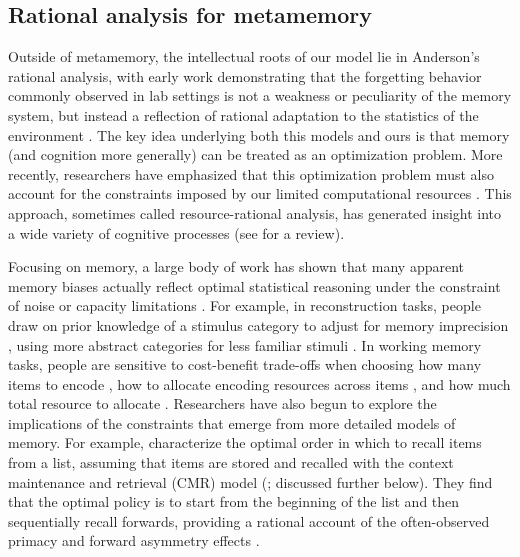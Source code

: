 


\subsection{Rational analysis for metamemory}

Outside of metamemory, the intellectual roots of our model lie in Anderson's \citeyearpar{anderson1990adaptive} rational analysis, with early work demonstrating that the forgetting behavior commonly observed in lab settings is not a weakness or peculiarity of the memory system, but instead a reflection of rational adaptation to the statistics of the environment \citep{anderson1989human}. The key idea underlying both this models and ours is that memory (and cognition more generally) can be treated as an optimization problem. More recently, researchers have emphasized that this optimization problem must also account for the constraints imposed by our limited computational resources \citep{griffiths2015rational,howes2009rational,lewis2014computational,gershman2015computational}. This approach, sometimes called resource-rational analysis, has generated insight into a wide variety of cognitive processes (see \citealp{lieder2020resourcerational} for a review).

Focusing on memory, a large body of work has shown that many apparent memory biases actually reflect optimal statistical reasoning under the constraint of noise or capacity limitations \citep{gershman2021rational}. For example, in reconstruction tasks, people draw on prior knowledge of a stimulus category to adjust for memory imprecision \citep{huttenlocher2000categories}, using more abstract categories for less familiar stimuli \citep{hemmer2009bayesian}. In working memory tasks, people are sensitive to cost-benefit trade-offs when choosing how many items to encode \citep{howes2016predicting}, how to allocate encoding resources across items \citep{yoo2018strategic}, and how much total resource to allocate \citep{berg2018resourcerational}. Researchers have also begun to explore the implications of the constraints that emerge from more detailed models of memory. For example, \citet{zhang2022optimal} characterize the optimal order in which to recall items from a list, assuming that items are stored and recalled with the context maintenance and retrieval (CMR) model (\citealp{polyn2009context}; discussed further below). They find that the optimal policy is to start from the beginning of the list and then sequentially recall forwards, providing a rational account of the often-observed primacy and forward asymmetry effects \citep{zhang2022optimal}.


